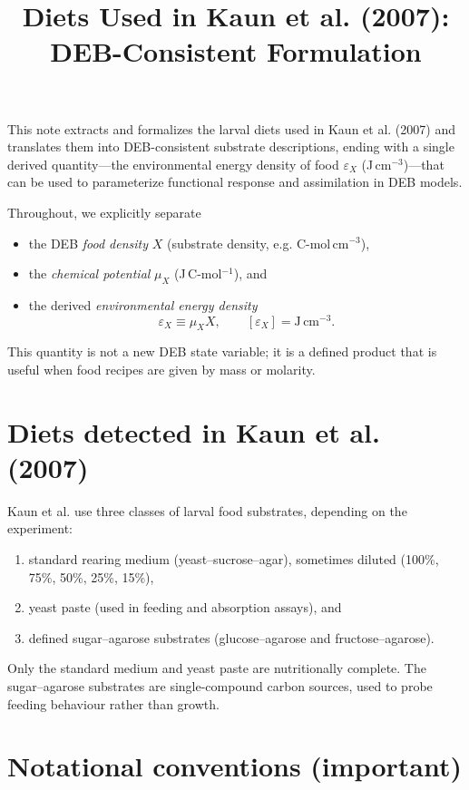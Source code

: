 \documentclass[11pt]{article}
\title{Diets Used in Kaun et al. (2007):\\DEB-Consistent Formulation}
\author{}
\date{}
\begin{document}
\maketitle

This note extracts and formalizes the larval diets used in Kaun et al. (2007) and translates them into DEB-consistent substrate descriptions, ending with a single derived quantity---the environmental energy density of food $\varepsilon_X$ (J\,cm$^{-3}$)---that can be used to parameterize functional response and assimilation in DEB models.

Throughout, we explicitly separate
\begin{itemize}
  \item the DEB \emph{food density} $X$ (substrate density, e.g. C-mol\,cm$^{-3}$),
  \item the \emph{chemical potential} $\mu_X$ (J\,C-mol$^{-1}$), and
  \item the derived \emph{environmental energy density}
  \begin{equation}
    \varepsilon_X \equiv \mu_X X, \qquad [\varepsilon_X] = \mathrm{J\,cm^{-3}}.
  \end{equation}
\end{itemize}

This quantity is not a new DEB state variable; it is a defined product that is useful when food recipes are given by mass or molarity.

\section{Diets detected in Kaun et al. (2007)}

Kaun et al. use three classes of larval food substrates, depending on the experiment:
\begin{enumerate}
  \item standard rearing medium (yeast--sucrose--agar), sometimes diluted (100\%, 75\%, 50\%, 25\%, 15\%),
  \item yeast paste (used in feeding and absorption assays), and
  \item defined sugar--agarose substrates (glucose--agarose and fructose--agarose).
\end{enumerate}

Only the standard medium and yeast paste are nutritionally complete. The sugar--agarose substrates are single-compound carbon sources, used to probe feeding behaviour rather than growth.

\section{Notational conventions (important)}
\end{document}
